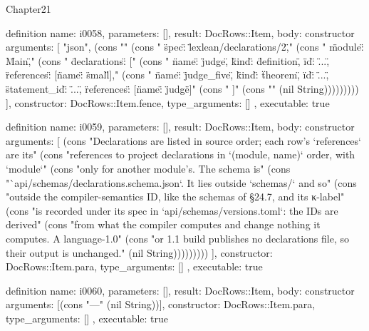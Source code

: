\begin{lexlean}{Chapter21}
\begin{semanticmodule}
definition{
  name: i0058,
  parameters: [],
  result: DocRows::Item,
  body: constructor{
    arguments: [
      "json",
      (cons "{" (cons "  \"spec\": \"lexlean/declarations/2\"," (cons "  \"module\": \"Main\"," (cons "  \"declarations\": [" (cons "    {\"name\": \"judge\", \"kind\": \"definition\", \"id\": \"...\", \"references\": [{\"name\": \"small\"}]}," (cons "    {\"name\": \"judge_five\", \"kind\": \"theorem\", \"id\": \"...\", \"statement_id\": \"...\", \"references\": [{\"name\": \"judge\"}]}" (cons "  ]" (cons "}" (nil String)))))))))
    ],
    constructor: DocRows::Item.fence,
    type_arguments: []
  },
  executable: true
}

definition{
  name: i0059,
  parameters: [],
  result: DocRows::Item,
  body: constructor{
    arguments: [
      (cons "Declarations are listed in source order; each row's `references` are its" (cons "references to project declarations in `(module, name)` order, with `module`" (cons "only for another module's. The schema is" (cons "`api/schemas/declarations.schema.json`. It lies outside `schemas/` and so" (cons "outside the compiler-semantics ID, like the schemas of §24.7, and its κ-label" (cons "is recorded under its spec in `api/schemas/versions.toml`: the IDs are derived" (cons "from what the compiler computes and change nothing it computes. A language-1.0" (cons "or 1.1 build publishes no declarations file, so their output is unchanged." (nil String)))))))))
    ],
    constructor: DocRows::Item.para,
    type_arguments: []
  },
  executable: true
}

definition{
  name: i0060,
  parameters: [],
  result: DocRows::Item,
  body: constructor{
    arguments: [(cons "---" (nil String))],
    constructor: DocRows::Item.para,
    type_arguments: []
  },
  executable: true
}
\end{semanticmodule}
\end{lexlean}
